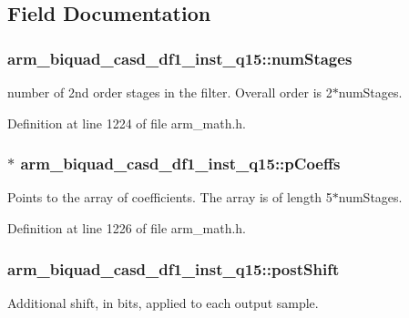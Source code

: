 \subsection{Field Documentation}
\hypertarget{structarm__biquad__casd__df1__inst__q15_ad6d95e70abcf4ff1300181415ad92153}{
\subsubsection[{num\-Stages}]{ arm\-\_\-biquad\-\_\-casd\-\_\-df1\-\_\-inst\-\_\-q15\-::num\-Stages}}\label{structarm__biquad__casd__df1__inst__q15_ad6d95e70abcf4ff1300181415ad92153}
number of 2nd order stages in the filter. Overall order is 2$\ast$num\-Stages. 

Definition at line 1224 of file arm\-\_\-math.\-h.

\hypertarget{structarm__biquad__casd__df1__inst__q15_a1edaacdebb5b09d7635bf20c779855fc}{
\subsubsection[{p\-Coeffs}]{$\ast$ arm\-\_\-biquad\-\_\-casd\-\_\-df1\-\_\-inst\-\_\-q15\-::p\-Coeffs}}\label{structarm__biquad__casd__df1__inst__q15_a1edaacdebb5b09d7635bf20c779855fc}
Points to the array of coefficients. The array is of length 5$\ast$num\-Stages. 

Definition at line 1226 of file arm\-\_\-math.\-h.

\hypertarget{structarm__biquad__casd__df1__inst__q15_ada7e9d6269e6ed4eacf8f68729e9832d}{
\subsubsection[{post\-Shift}]{ arm\-\_\-biquad\-\_\-casd\-\_\-df1\-\_\-inst\-\_\-q15\-::post\-Shift}}\label{structarm__biquad__casd__df1__inst__q15_ada7e9d6269e6ed4eacf8f68729e9832d}
Additional shift, in bits, applied to each output sample. 

